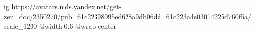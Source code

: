  
 
 
 
 

\ifcmt
  ig https://avatars.mds.yandex.net/get-zen_doc/2350270/pub_61c22398095ed628a9db06dd_61c223ade03014225d760f5a/scale_1200
  @width 0.6
  @wrap center 
\fi
